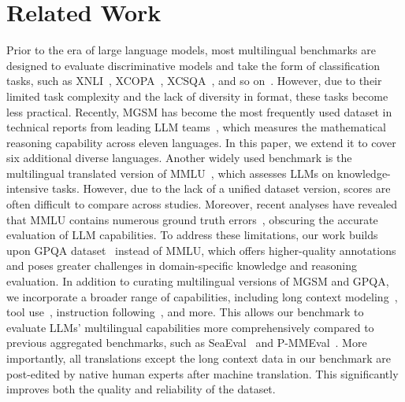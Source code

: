 \section{Related Work}
Prior to the era of large language models, most multilingual benchmarks are designed to evaluate discriminative models and take the form of classification tasks, such as \textsc{XNLI}~\cite{conneau2018xnli}, \textsc{XCOPA}~\cite{ponti2020xcopa}, \textsc{XCSQA}~\cite{talmor2019commonsenseqa}, and so on~\cite{xstorycloze-lin-etal-2022-shot,xwinograd-muennighoff-etal-2023-crosslingual}.
However, due to their limited task complexity and the lack of diversity in format, these tasks become less practical.
Recently, MGSM has become the most frequently used dataset in technical reports from leading LLM teams~\cite{dubey2024llama,team2024gemini,openai2024gpt4o}, which measures the mathematical reasoning capability across eleven languages.
In this paper, we extend it to cover six additional diverse languages. %
Another widely used benchmark is the multilingual translated version of MMLU~\cite{hendrycks2021measuring,lai2023okapi,singh2024global}, which assesses LLMs on knowledge-intensive tasks. 
However, due to the lack of a unified dataset version, scores are often difficult to compare across studies. 
Moreover, recent analyses have revealed that MMLU contains numerous ground truth errors~\cite{gema2024are}, obscuring the accurate evaluation of LLM capabilities.
To address these limitations, our work builds upon GPQA dataset~\cite{Rein2023GPQAAG} instead of MMLU, which offers higher-quality annotations and poses greater challenges in domain-specific knowledge and reasoning evaluation. 
In addition to curating multilingual versions of MGSM and GPQA, we incorporate a broader range of capabilities, including long context modeling~\cite{hsieh2024ruler}, tool use~\cite{srinivasan2023nexusraven}, instruction following~\cite{zhou2023instruction}, and more. 
This allows our benchmark to evaluate LLMs' multilingual capabilities more comprehensively compared to previous aggregated benchmarks, such as SeaEval~\cite{wang2024seaeval} and P-MMEval~\cite{zhang2024pmmeval}.
More importantly, all translations except the long context data in our benchmark are post-edited by native human experts after machine translation.
This significantly improves both the quality and reliability of the dataset.

